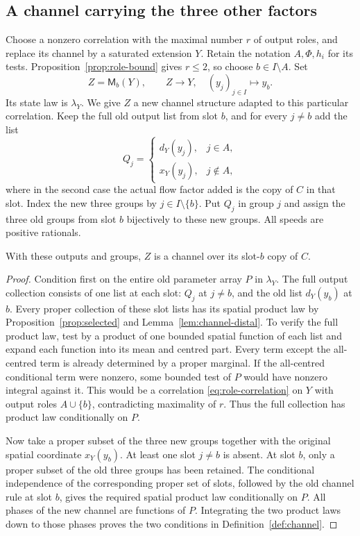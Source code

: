 \subsection{A channel carrying the three other factors}

Choose a nonzero correlation with the maximal number $r$ of output
roles, and replace its channel by a saturated extension $Y$. Retain
the notation $A,\Phi,h_i$ for its tests. Proposition~\ref{prop:role-bound}
gives $r\le2$, so choose $b\in I\setminus A$. Set
\[
 Z=\mathsf M_b(Y),\qquad Z\longrightarrow Y,\quad
 (y_j)_{j\in I}\longmapsto y_b.
\]
Its state law is $\lambda_Y$. We give $Z$ a new channel structure
adapted to this particular correlation. Keep the full old output list
from slot $b$, and for every $j\ne b$ add the list
\begin{equation}\label{eq:added-output-lists}
 Q_j=
 \begin{cases}
   d_Y(y_j),&j\in A,\\
   x_Y(y_j),&j\notin A,
 \end{cases}
\end{equation}
where in the second case the actual flow factor added is the copy of
$C$ in that slot. Index the new three groups by $j\in I\setminus\{b\}$.
Put $Q_j$ in group $j$ and assign the three old groups from slot $b$
bijectively to these new groups. All speeds are positive rationals.

\begin{lemma}\label{lem:regrouped-channel}
With these outputs and groups, $Z$ is a channel over its slot-$b$
copy of $C$.
\end{lemma}

\begin{proof}
Condition first on the entire old parameter array $P$ in $\lambda_Y$.
The full output collection consists of one list at each slot: $Q_j$
at $j\ne b$, and the old list $d_Y(y_b)$ at $b$. Every proper collection
of these slot lists has its spatial product law by
Proposition~\ref{prop:selected} and Lemma~\ref{lem:channel-distal}.
To verify the full product law, test by a product of one bounded spatial
function of each list and expand each function into its mean and
centred part. Every term except the all-centred term is already
determined by a proper marginal. If the all-centred conditional term
were nonzero, some bounded test of $P$ would have nonzero integral
against it. This would be a correlation \eqref{eq:role-correlation}
on $Y$ with output roles $A\cup\{b\}$, contradicting maximality of $r$.
Thus the full collection has product law conditionally on $P$.

Now take a proper subset of the three new groups together with the
original spatial coordinate $x_Y(y_b)$. At least one slot $j\ne b$ is
absent. At slot $b$, only a proper subset of the old three groups has
been retained. The conditional independence of the corresponding
proper set of slots, followed by the old channel rule at slot $b$,
gives the required spatial product law conditionally on $P$.
All phases of the new channel are functions of $P$. Integrating the
two product laws down to those phases proves the two conditions in
Definition~\ref{def:channel}.
\end{proof}

